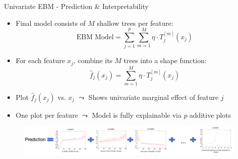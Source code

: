 \documentclass[11pt,compress,t,notes=noshow, aspectratio=169, xcolor=table]{beamer}
\begin{document}




\begin{frame}{Univariate EBM - Prediction \& Interpretability}
\begin{itemize}
    \item Final model consists of $M$ shallow trees per feature:
    $$
    \text{EBM Model} = \sum_{j=1}^p \sum_{m=1}^M \eta \cdot T_j^{[m]}(x_j)
    $$
    \item For each feature $x_j$, combine its $M$ trees into a shape function:
    $$
    \hat{f}_j(x_j) = \sum_{m=1}^M \eta \cdot T_j^{[m]}(x_j)
    $$
    \item Plot $\hat{f}_j(x_j)$ vs. $x_j$ $\leadsto$ Shows univariate marginal effect of feature $j$
    \item One plot per feature $\leadsto$ Model is fully explainable via $p$ additive plots
\end{itemize}

\medskip

\begin{figure}
    \centering
    \includegraphics[width=\textwidth]{figure/ebm_prediction.png}
\end{figure}
\end{frame}
\end{document}
